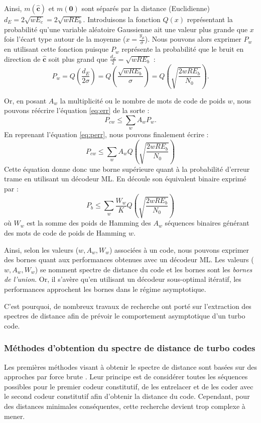 Ainsi, $m(\mathbf{\hat{c}})$ et $m(\mathbf{0})$ sont séparés par la distance (Euclidienne) $d_E = 2\sqrt{wE_c} = 2\sqrt{wRE_b}$. 
Introduisons la fonction $Q(x)$ représentant la probabilité qu'une variable aléatoire Gaussienne ait une valeur plus 
grande que $x$ fois l'écart type autour de la moyenne ($x=\frac{y_\mu}{\sigma}$). Nous pouvons alors exprimer $P_w$ en 
utilisant cette fonction puisque $P_w$ représente la probabilité que le bruit en direction de $\mathbf{\hat{c}}$ soit 
plus grand que $\frac{d_E}{2} = \sqrt{wRE_b}$ : 
\begin{equation}\label{eq:perr}
	P_w = Q\left(\frac{d_E}{2\sigma}\right) = Q\left(\frac{\sqrt{wRE_b}}{\sigma}\right) = Q\left(\sqrt{\frac{2wRE_b}{N_0}}\right).  
\end{equation} 

Or, en posant $A_w$ la multiplicité ou le nombre de mots de code de poids $w$, nous pouvons réécrire l'équation \ref{eq:err} de la sorte : 
\[P_{cw} \le \sum\limits_w A_wP_w.\]
En reprenant l'équation \ref{eq:perr}, nous pouvons finalement écrire :
\begin{equation} \label{eq:uboundfer}
	P_{cw} \le \sum\limits_w A_w Q\left(\sqrt{\frac{2wRE_b}{N_0}}\right)
\end{equation}
Cette équation donne donc une borne supérieure quant à la probabilité d'erreur trame en utilisant un décodeur ML. En 
découle son équivalent binaire exprimé par :
\begin{equation} \label{eq:uboundber}
	P_{b} \le \sum\limits_w \frac{W_w}{K} Q\left(\sqrt{\frac{2wRE_b}{N_0}}\right)
\end{equation} 
où $W_w$ est la somme des poids de Hamming des $A_w$ séquences binaires générant des mots de code de poids de Hamming $w$.
	
Ainsi, selon les valeurs ($w,A_w,W_w$) associées à un code, nous pouvons exprimer des bornes quant aux performances 
obtenues avec un décodeur ML. Les valeurs ($w,A_w,W_w$) se nomment spectre de distance du code et les bornes sont les 
\emph{bornes de l'union}. Or, il s'avère qu'en utilisant un décodeur sous-optimal itératif, les performances approchent 
les bornes dans le régime asymptotique.
	
C'est pourquoi, de nombreux travaux de recherche ont porté sur l'extraction des spectres de distance afin de prévoir le 
comportement asymptotique d'un turbo code.
	
\subsubsection{Méthodes d'obtention du spectre de distance de turbo codes}\label{seq:spectre}
Les premières méthodes visant à obtenir le spectre de distance sont basées sur des approches par force brute \cite{illuminating}. 
Leur principe est de considérer toutes les séquences possibles pour le premier codeur constitutif, de les entrelacer et 
de les coder avec le second codeur constitutif afin d'obtenir la distance du code. Cependant, pour des distances minimales 
conséquentes, cette recherche devient trop complexe à mener.
	
